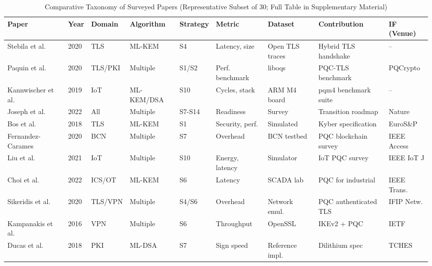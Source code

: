 \documentclass[journal]{IEEEtran}
\begin{document}
\begin{table}[!t]
\caption{Comparative Taxonomy of Surveyed Papers (Representative Subset of 30; Full Table in Supplementary Material)}
\label{tab:taxonomy_comparative}
\centering
\scriptsize
\renewcommand{\arraystretch}{1.1}
\begin{tabular}{@{}L{2.5cm}C{1.0cm}C{1.3cm}C{1.3cm}C{1.3cm}C{1.3cm}C{1.2cm}C{2.0cm}C{1.5cm}@{}}
\toprule
\textbf{Paper} & \textbf{Year} & \textbf{Domain} & \textbf{Algorithm} & \textbf{Strategy} & \textbf{Metric} & \textbf{Dataset} & \textbf{Contribution} & \textbf{IF (Venue)} \\
\midrule
Stebila et al.~\cite{stebila2020postquantum}      & 2020 & TLS     & ML-KEM    & S4 & Latency, size & Open TLS traces & Hybrid TLS handshake & -- \\
Paquin et al.~\cite{paquin2020benchmarking}       & 2020 & TLS/PKI & Multiple  & S1/S2 & Perf. benchmark & liboqs & PQC-TLS benchmark & PQCrypto \\
Kannwischer et al.~\cite{kannwischer2019pqm4}     & 2019 & IoT     & ML-KEM/DSA & S10 & Cycles, stack & ARM M4 board & pqm4 benchmark suite & -- \\
Joseph et al.~\cite{joseph2022transitioning}      & 2022 & All     & Multiple  & S7-S14 & Readiness & Survey & Transition roadmap & Nature \\
Bos et al.~\cite{bos2018crystals}                 & 2018 & TLS     & ML-KEM    & S1 & Security, perf. & Simulated & Kyber specification & EuroS\&P \\
Fernandez-Carames~\cite{fernandezcarames2020review} & 2020 & BCN   & Multiple  & S7 & Overhead & BCN testbed & PQC blockchain survey & IEEE Access \\
Liu et al.~\cite{liu2021pqc}                      & 2021 & IoT     & Multiple  & S10 & Energy, latency & Simulator & IoT PQC survey & IEEE IoT J \\
Choi et al.~\cite{choi2022pqc}                    & 2022 & ICS/OT  & ML-KEM    & S6 & Latency & SCADA lab & PQC for industrial & IEEE Trans. \\
Sikeridis et al.~\cite{sikeridis2020pqc}          & 2020 & TLS/VPN & Multiple  & S4/S6 & Overhead & Network emul. & PQC authenticated TLS & IFIP Netw. \\
Kampanakis et al.~\cite{kampanakis2016post}       & 2016 & VPN     & Multiple  & S6 & Throughput & OpenSSL & IKEv2 + PQC & IETF \\
Ducas et al.~\cite{ducas2018crystals}             & 2018 & PKI     & ML-DSA    & S7 & Sign speed & Reference impl. & Dilithium spec & TCHES \\

\end{tabular}
\end{table}
\end{document}
